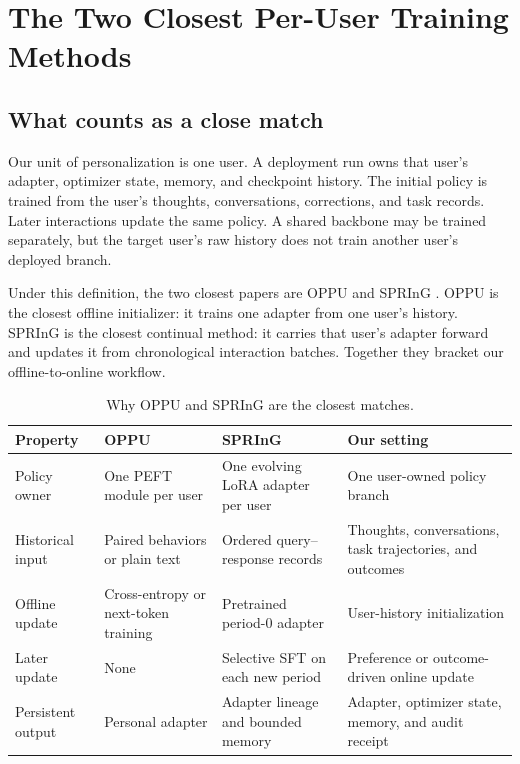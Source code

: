 \section{The Two Closest Per-User Training Methods}
\label{sec:closest-per-user}

\subsection{What counts as a close match}

Our unit of personalization is one user.  A deployment run owns that user's
adapter, optimizer state, memory, and checkpoint history.  The initial policy
is trained from the user's thoughts, conversations, corrections, and task
records.  Later interactions update the same policy.  A shared backbone may
be trained separately, but the target user's raw history does not train
another user's deployed branch.

Under this definition, the two closest papers are OPPU
\citep{tan2024oppu} and SPRInG \citep{kim2026spring}.  OPPU is the closest
offline initializer: it trains one adapter from one user's history.  SPRInG
is the closest continual method: it carries that user's adapter forward and
updates it from chronological interaction batches.  Together they bracket
our offline-to-online workflow.

\begin{table}[t]
  \centering
  \caption{Why OPPU and SPRInG are the closest matches.}
  \label{tab:closest-match}
  \begin{tabularx}{\textwidth}{@{}L{0.18\textwidth}YYY@{}}
    \toprule
    Property & OPPU & SPRInG & Our setting \\
    \midrule
    Policy owner &
    One PEFT module per user &
    One evolving LoRA adapter per user &
    One user-owned policy branch \\
    Historical input &
    Paired behaviors or plain text &
    Ordered query--response records &
    Thoughts, conversations, task trajectories, and outcomes \\
    Offline update &
    Cross-entropy or next-token training &
    Pretrained period-0 adapter &
    User-history initialization \\
    Later update &
    None &
    Selective SFT on each new period &
    Preference or outcome-driven online update \\
    Persistent output &
    Personal adapter &
    Adapter lineage and bounded memory &
    Adapter, optimizer state, memory, and audit receipt \\
    \bottomrule
  \end{tabularx}
\end{table}

